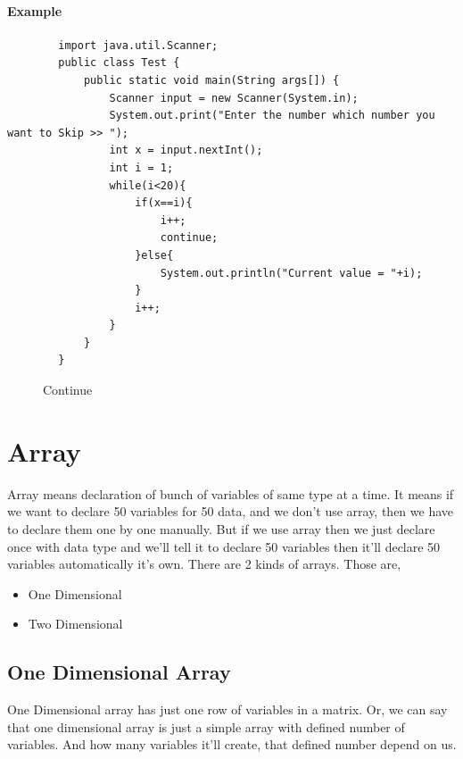 \documentclass[openany]{book}  %
\begin{document}
\subsubsection{Example}
\begin{center}
    \begin{verbatim}
        import java.util.Scanner;
        public class Test {
            public static void main(String args[]) {
                Scanner input = new Scanner(System.in);
                System.out.print("Enter the number which number you want to Skip >> ");
                int x = input.nextInt();
                int i = 1;
                while(i<20){
                    if(x==i){
                        i++;
                        continue;
                    }else{
                        System.out.println("Current value = "+i);
                    }
                    i++;
                }
            }
        }
    \end{verbatim}
\end{center}
% 
% 
\begin{figure}[htbp]
    \begin{center}
        \caption{Continue}
    \end{center}
\end{figure}


% 
% 
\chapter{Array}
Array means declaration of bunch of variables of same type at a time.
It means if we want to declare 50 variables for 50 data, and we don't
use array, then we have to declare them one by one manually. But if we 
use array then we just declare once with data type and we'll tell
it to declare 50 variables then it'll declare 50 variables automatically
it's own. There are 2 kinds of arrays. Those are,
\begin{itemize}
    \item One Dimensional
    \item Two Dimensional
\end{itemize}
% 
% 
\section{One Dimensional Array}
One Dimensional array has just one row of variables in a matrix.
Or, we can say that one dimensional array is just a simple array
with defined number of variables. And how many variables it'll
create, that defined number depend on us.
% 
%
\end{document}

